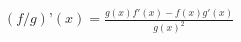 \documentclass[preview]{standalone}
\begin{document}
\begin{align*}
(f/g)’(x) = \frac{g(x)f'(x) - f(x)g'(x)}{g(x)^2}
\end{align*}
\end{document}
